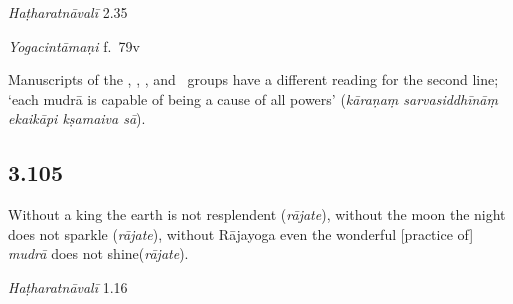 \begin{ekdosis}
\begin{sources}[hp03_104]
\end{sources}

\begin{testimonia}[hp03_104]

\emph{Haṭharatnāvalī} 2.35
\begin{versinnote}
\end{versinnote}

\emph{Yogacintāmaṇi} f.~79v
\begin{versinnote}
\end{versinnote}

\end{testimonia}

\begin{philcomm}[hp03_104]
Manuscripts of the \textbeta, \textepsilon, \texteta, and \textzeta\ groups have a different reading for the second line; `each mudrā is capable of being a cause of all powers' (\emph{kāraṇaṃ sarvasiddhīnāṃ ekaikāpi kṣamaiva sā}).%
\end{philcomm}


\subsection*{3.105}
\begin{translation}[hp03_105]
Without a king the earth is not resplendent (\emph{rājate}), without the moon the night does not sparkle (\emph{rājate}), without Rājayoga even the wonderful [practice of] \emph{mudrā} does not shine(\emph{rājate}).
\end{translation}



\begin{testimonia}[hp03_105]
\emph{Haṭharatnāvalī} 1.16
\begin{versinnote}
\end{versinnote}


\end{testimonia}
\end{ekdosis}
